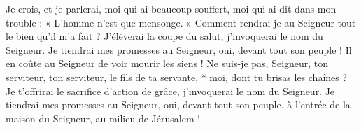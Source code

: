 Je crois, et je parlerai, moi qui ai beaucoup souffert,
\versseparator
moi qui ai dit dans mon trouble : « L'homme n'est que mensonge. »
\versseparator
Comment rendrai-je au Seigneur tout le bien qu'il m'a fait ?
\versseparator
J'élèverai la coupe du salut, j'invoquerai le nom du Seigneur.
\versseparator
Je tiendrai mes promesses au Seigneur, oui, devant tout son peuple !
\versseparator
Il en coûte au Seigneur de voir mourir les siens !
\versseparator
Ne suis-je pas, Seigneur, ton serviteur, ton serviteur, le fils de ta servante, * moi, dont tu brisas les chaînes ?
\versseparator
Je t'offrirai le sacrifice d'action de grâce, j'invoquerai le nom du Seigneur.
\versseparator
Je tiendrai mes promesses au Seigneur, oui, devant tout son peuple,
\versseparator
à l'entrée de la maison du Seigneur, au milieu de Jérusalem !
